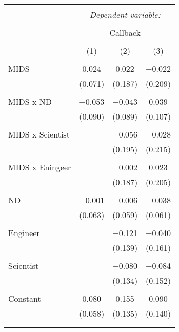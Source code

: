 \documentclass[11pt, oneside]{article}
\begin{document}
 

\begin{table}[!htbp] \centering 
  \caption{} 
  \label{} 
\begin{tabular}{@{\extracolsep{5pt}}lccc} 
\\[-1.8ex]\hline 
\hline \\[-1.8ex] 
 & \multicolumn{3}{c}{\textit{Dependent variable:}} \\ 
\cline{2-4} 
\\[-1.8ex] & \multicolumn{3}{c}{Callback} \\ 
\\[-1.8ex] & (1) & (2) & (3)\\ 
\hline \\[-1.8ex] 
 MIDS & 0.024 & 0.022 & $-$0.022 \\ 
  & (0.071) & (0.187) & (0.209) \\ 
  & & & \\ 
 MIDS x ND & $-$0.053 & $-$0.043 & 0.039 \\ 
  & (0.090) & (0.089) & (0.107) \\ 
  & & & \\ 
 MIDS x Scientist &  & $-$0.056 & $-$0.028 \\ 
  &  & (0.195) & (0.215) \\ 
  & & & \\ 
 MIDS x Eningeer &  & $-$0.002 & 0.023 \\ 
  &  & (0.187) & (0.205) \\ 
  & & & \\ 
 ND & $-$0.001 & $-$0.006 & $-$0.038 \\ 
  & (0.063) & (0.059) & (0.061) \\ 
  & & & \\ 
 Engineer &  & $-$0.121 & $-$0.040 \\ 
  &  & (0.139) & (0.161) \\ 
  & & & \\ 
 Scientist &  & $-$0.080 & $-$0.084 \\ 
  &  & (0.134) & (0.152) \\ 
  & & & \\ 
 Constant & 0.080 & 0.155 & 0.090 \\ 
  & (0.058) & (0.135) & (0.140) \\ 
  & & & \\ 
\hline \\[-1.8ex] 

\end{tabular}
\end{table}
\end{document}
